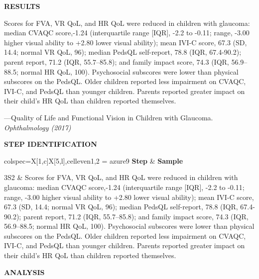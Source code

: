 \documentclass[a4paper]{ctexbook}
\begin{document}
\begin{sample}[label={myautocounter}]{\heiti}

  \textbf{RESULTS}
  
  Scores for FVA, VR QoL, and HR QoL were reduced in children with glaucoma: median CVAQC score,-1.24 (interquartile range [IQR], -2.2 to -0.11; range, -3.00 higher visual ability to +2.80 lower visual ability); mean IVI-C score, 67.3 (SD, 14.4; normal VR QoL, 96); median PedsQL self-report, 78.8 (IQR, 67.4-90.2); parent report, 71.2 (IQR, 55.7--85.8); and family impact score, 74.3 (IQR, 56.9--88.5; normal HR QoL, 100). Psychosocial subscores were lower than physical subscores on the PedsQL. Older children reported less impairment on CVAQC, IVI-C, and PedsQL than younger children. Parents reported greater impact on their child's HR QoL than children reported themselves.

  
  \begin{flushright}
    ---Quality of Life and Functional Vision in Children with Glaucoma. \emph{Ophthalmology (2017)}
  \end{flushright}

  \tcblower

  \noindent \textbf{STEP IDENTIFICATION}

  \vspace*{10pt}
  {\small\noindent
  \begin{tblr}{colspec={X[1,c]X[5,l]},cell{even}{1,2} = {azure9}}
    \toprule
    \textbf{Step} & \textbf{Sample} \\ 
    \midrule
  
    3S2 & Scores for FVA, VR QoL, and HR QoL were reduced in children with glaucoma: median CVAQC score,-1.24 (interquartile range [IQR], -2.2 to -0.11; range, -3.00 higher visual ability to +2.80 lower visual ability); mean IVI-C score, 67.3 (SD, 14.4; normal VR QoL, 96); median PedsQL self-report, 78.8 (IQR, 67.4-90.2); parent report, 71.2 (IQR, 55.7--85.8); and family impact score, 74.3 (IQR, 56.9--88.5; normal HR QoL, 100). Psychosocial subscores were lower than physical subscores on the PedsQL. Older children reported less impairment on CVAQC, IVI-C, and PedsQL than younger children. Parents reported greater impact on their child's HR QoL than children reported themselves.\\
    
    \bottomrule
  \end{tblr}
  }

  \noindent \textbf{ANALYSIS}


\end{sample}
\end{document}
